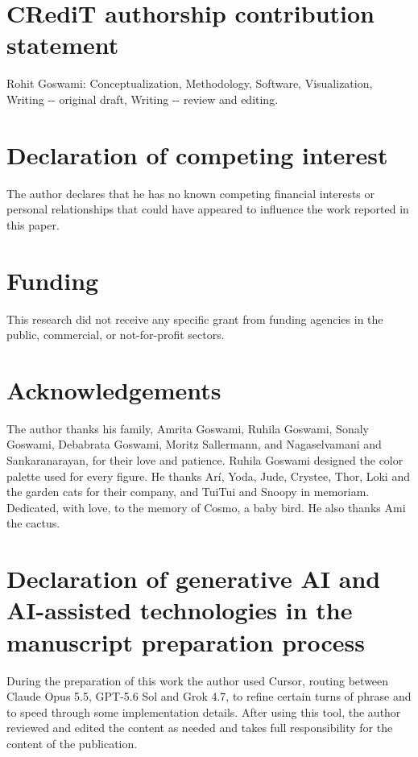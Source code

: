 \documentclass[preprint,12pt]{elsarticle}
\newcommand{\rcAITool}{Cursor, routing between Claude Opus 5.5, GPT-5.6 Sol and Grok 4.7}
\begin{document}
\FloatBarrier \section*{CRediT authorship contribution statement}\label{sec:credit} Rohit Goswami: Conceptualization, Methodology, Software, Visualization, Writing -{}- original draft, Writing -{}- review and editing.

\section*{Declaration of competing interest}\label{sec:competing}
The author declares that he has no known competing financial interests or personal relationships that could have appeared to influence the work reported in this paper.

\section*{Funding}\label{sec:funding}
This research did not receive any specific grant from funding agencies in the public, commercial, or not-for-profit sectors.

\section*{Acknowledgements}\label{sec:acknowledgements} The author thanks his family, Amrita Goswami, Ruhila Goswami, Sonaly Goswami, Debabrata Goswami, Moritz Sallermann, and Nagaselvamani and Sankaranarayan, for their love and patience.
Ruhila Goswami designed the color palette used for every figure.
He thanks Arí, Yoda, Jude, Crystee, Thor, Loki and the garden cats for their company, and TuiTui and Snoopy in memoriam.
Dedicated, with love, to the memory of Cosmo, a baby bird.
He also thanks Ami the cactus.

\section*{Declaration of generative AI and AI-assisted technologies in the manuscript preparation process}\label{sec:ai-declaration}
During the preparation of this work the author used \rcAITool{}, to refine certain turns of phrase and to speed through some implementation details.
After using this tool, the author reviewed and edited the content as needed and takes full responsibility for the content of the publication.

\FloatBarrier %
\DeclareUrlCommand{}

\raggedright




\end{document}
